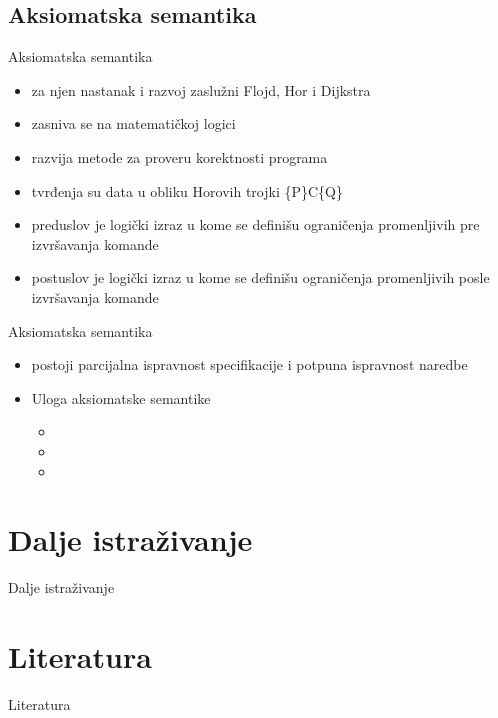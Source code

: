 \documentclass{beamer}
\begin{document}
\subsection{Aksiomatska semantika}
\begin{frame}{Aksiomatska semantika}
  \begin{itemize}
  \item za njen nastanak i razvoj zaslužni Flojd, Hor i Dijkstra
  \item zasniva se na matematičkoj logici
  \item razvija metode za proveru korektnosti programa
   \item tvrđenja su data u obliku Horovih trojki \{P\}C\{Q\}
   \item preduslov je logički izraz u kome se definišu ograničenja promenljivih pre izvršavanja komande
   \item postuslov je logički izraz u kome se definišu ograničenja promenljivih posle izvršavanja komande
  \end{itemize}
\end{frame}

\begin{frame}{Aksiomatska semantika}
 \begin{itemize}
  \item postoji parcijalna ispravnost specifikacije i potpuna ispravnost naredbe
  \item Uloga aksiomatske semantike
  \begin{itemize}
  \item 
   \item 
   \item 
    \end{itemize} 
  \end{itemize} 
\end{frame}
\section{Dalje istraživanje}
\begin{frame}{Dalje istraživanje}
  
\end{frame}
\section{Literatura}
\begin{frame}{Literatura}
  
\end{frame}
\end{document}
